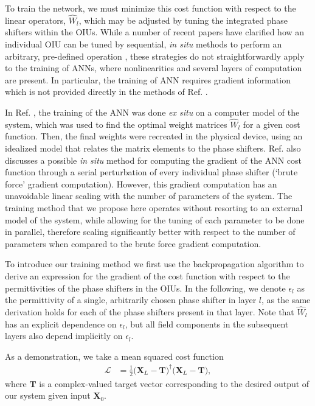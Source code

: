 To train the network, we must minimize this cost function with respect to the linear operators, $\hat{W}_l$, which may be adjusted by tuning the integrated phase shifters within the OIUs.  While a number of recent papers have clarified how an individual OIU can be tuned by sequential,  \textit{in situ} methods to perform an arbitrary, pre-defined operation \cite{Miller2013, Miller2013a, Miller2015, Annoni2017}, these strategies do not straightforwardly apply to the training of ANNs, where nonlinearities and several layers of computation are present.  In particular, the training of ANN requires gradient information which is not provided directly in the methods of Ref. \cite{Miller2013, Miller2013a, Miller2015, Annoni2017}.

In Ref. \cite{Shen2017}, the training of the ANN was done \textit{ex situ} on a computer model of the system, which was used to find the optimal weight matrices $\hat{W}_l$ for a given cost function. Then, the final weights were recreated in the physical device, using an idealized model that relates the matrix elements to the phase shifters. Ref. \cite{Shen2017} also discusses a possible \textit{in situ} method for computing the gradient of the ANN cost function through a serial perturbation of every individual phase shifter (`brute force' gradient computation). However, this gradient computation has an unavoidable linear scaling with the number of parameters of the system.  The training method that we propose here operates without resorting to an external model of the system, while allowing for the tuning of each parameter to be done in parallel, therefore scaling significantly better with respect to the number of parameters when compared to the brute force gradient computation.

To introduce our training method we first use the backpropagation algorithm to derive an expression for the gradient of the cost function with respect to the permittivities of the phase shifters in the OIUs. In the following, we denote $\epsilon_l$ as the permittivity of a single, arbitrarily chosen phase shifter in layer $l$, as the same derivation holds for each of the phase shifters present in that layer.  Note that $\hat{W}_l$ has an explicit dependence on $\epsilon_l$, but all field components in the subsequent layers also depend implicitly on $\epsilon_l$.

As a demonstration, we take a mean squared cost function
\begin{align}
\mathcal{L} &= \frac{1}{2}\big(\mathbf{X}_L -\mathbf{T} \big)^\dagger \big( \mathbf{X}_L -\mathbf{T} \big),
\label{eq:NN_forward}
\end{align}
where $\mathbf{T}$ is a complex-valued target vector corresponding to the desired output of our system given input $\mathbf{X}_0$.

